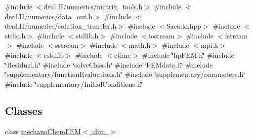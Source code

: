 {\ttfamily \#include $<$deal.\+I\+I/numerics/matrix\+\_\+tools.\+h$>$}\newline
{\ttfamily \#include $<$deal.\+I\+I/numerics/data\+\_\+out.\+h$>$}\newline
{\ttfamily \#include $<$deal.\+I\+I/numerics/solution\+\_\+transfer.\+h$>$}\newline
{\ttfamily \#include $<$Sacado.\+hpp$>$}\newline
{\ttfamily \#include $<$stdio.\+h$>$}\newline
{\ttfamily \#include $<$stdlib.\+h$>$}\newline
{\ttfamily \#include $<$iostream$>$}\newline
{\ttfamily \#include $<$fstream$>$}\newline
{\ttfamily \#include $<$sstream$>$}\newline
{\ttfamily \#include $<$math.\+h$>$}\newline
{\ttfamily \#include $<$mpi.\+h$>$}\newline
{\ttfamily \#include $<$cstdlib$>$}\newline
{\ttfamily \#include $<$ctime$>$}\newline
{\ttfamily \#include \char`\"{}hp\+F\+E\+M.\+h\char`\"{}}\newline
{\ttfamily \#include \char`\"{}Residual.\+h\char`\"{}}\newline
{\ttfamily \#include \char`\"{}solve\+Class.\+h\char`\"{}}\newline
{\ttfamily \#include \char`\"{}F\+E\+Mdata.\+h\char`\"{}}\newline
{\ttfamily \#include \char`\"{}supplementary/function\+Evaluations.\+h\char`\"{}}\newline
{\ttfamily \#include \char`\"{}supplementary/parameters.\+h\char`\"{}}\newline
{\ttfamily \#include \char`\"{}supplementary/\+Initial\+Conditions.\+h\char`\"{}}\newline
\subsection*{Classes}
\begin{DoxyCompactItemize}
\item 
class \mbox{\hyperlink{classmechano_chem_f_e_m}{mechano\+Chem\+F\+E\+M$<$ dim $>$}}
\end{DoxyCompactItemize}

